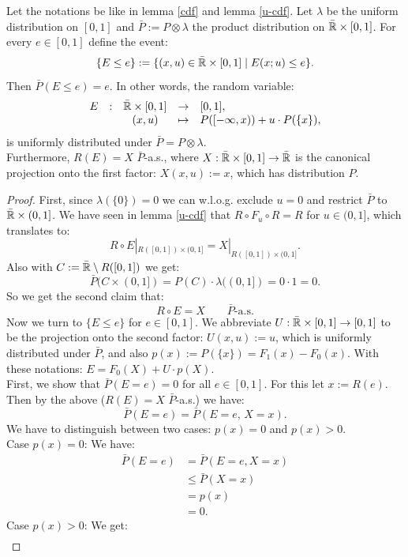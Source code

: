 \begin{Lem}
    \label{unif-cdf}
Let the notations be like in lemma \ref{cdf} and lemma \ref{u-cdf}. 
Let $\lambda$ be the uniform distribution on $[0,1]$ and 
$\bar P := P \otimes \lambda$ the product distribution on $\bar{\mathbb{R}} \times [0,1]$.
For every $e \in [0,1]$ define the event:
\[ \{ E \le e\} := \{ (x,u) \in \bar{\mathbb{R}} \times [0,1] \;|\; E(x;u) \le e\}.  \]
Then $\bar P(E \le e) = e$.
In other words, the random variable: 
\[ \begin{array}{ccccl} 
 E &:& \bar\R\times[0,1] &\to& [0,1], \\
   && (x,u) &\mapsto& P([-\infty,x))+ u \cdot P(\{x\}),
\end{array}%
 \]
is uniformly distributed under $\bar P=P\otimes\lambda$.\\
Furthermore, $R(E) = X$ $\bar P$-a.s., where $X: \bar{\mathbb{R}} \times [0,1] \to \bar{\mathbb{R}}$ is the canonical projection onto the first factor: $X(x,u):=x$, which has distribution $P$.
\begin{proof}
    First, since $\lambda(\{0\})=0$ we can w.l.o.g. exclude $u=0$ and restrict $\bar P$ to 
    $\bar{\mathbb{R}} \times (0,1]$.
    We have seen in lemma \ref{u-cdf} that $R \circ F_u \circ R =R$ for $u \in (0,1]$, 
    which translates to:
 \[ R \circ E |_{R([0,1]) \times (0,1]} = X|_{R([0,1]) \times (0,1]}. \]
 Also with $C:=\bar{\mathbb{R}} \setminus R([0,1])$ we get:
 \[\bar P( C \times (0,1]) = P(C) \cdot \lambda((0,1]) = 0 \cdot 1 = 0.\]
 So we get the second claim that:
 \[R \circ E = X \qquad \bar P\text{-a.s.}\]%
%
 Now we turn to $\{E \le e\}$ for $e \in [0,1]$. We abbreviate  
 $U: \bar{\mathbb{R}} \times [0,1] \to [0,1]$ to be the projection onto the
second factor: $U(x,u):=u$, which is uniformly distributed under $\bar P$, 
and also $p(x):=  P(\{x\}) = F_1(x)-F_0(x)$. With these notations: $E=F_0(X)+U \cdot p(X)$.\\
%
First, we  show that $\bar P(E=e)=0$ for all $e \in[0,1]$. For this let $x:=R(e)$. 
 Then by the above ($R(E)=X$ $\bar P$-a.s.) we have:
\[ \bar P(E=e) = \bar P(E=e,\, X=x).\]
We have to distinguish between two cases: $p(x)=0$ and $p(x)>0$.\\
 Case $p(x)=0$: We have:
 \begin{align*}
     \bar P(E=e) &= \bar P(E=e,X=x)\\
                  &\le \bar P(X=x) \\
                  & = p(x) \\
                  & =0.
 \end{align*}
 Case $p(x) > 0$: We get:
 \begin{align*}

\end{align*}
\end{proof}
\end{Lem}
